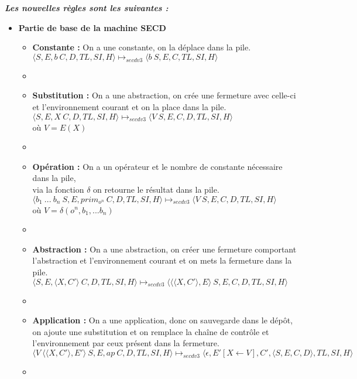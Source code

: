 \documentclass[10pt,a4paper]{article}
\begin{document}
				
				\textbf{\textit{Les nouvelles règles sont les suivantes :}}
				\smallbreak
				\begin{itemize}
					\item[] \textbf{Partie de base de la machine SECD}
					\begin{itemize}
						\item[] \textbf{Constante :} On a une constante, on la déplace dans la pile.
						\smallbreak
						$\langle S,E,b~C,D,TL,SI,H\rangle \longmapsto_{secdv3} \langle b~S,E,C,TL,SI,H\rangle$
						\item[]
						
						\item[] \textbf{Substitution :} On a une abstraction, on crée une fermeture avec celle-ci et l'environnement courant et on la place dans la pile.
						\smallbreak
						$\langle S,E,X~C,D,TL,SI,H\rangle \longmapsto_{secdv3} \langle V~S,E,C,D,TL,SI,H\rangle$
						\\où $V = E(X)$
						\item[]
						
						\item[] \textbf{Opération :} On a un opérateur et le nombre de constante nécessaire dans la pile, \\via la fonction $\delta$ on retourne le résultat dans la pile.
						\smallbreak
						$\langle b_{1}~...~b_{n}~S,E,prim_{o^{n}}~C,D,TL,SI,H\rangle \longmapsto_{secdv3} \langle V~S,E,C,D,TL,SI,H\rangle$ 
						\\où $V = \delta(o^{n},b_1,...b_{n})$
						\item[]
						
						\item[]  \textbf{Abstraction :} On a une abstraction, on créer une fermeture comportant l'abstraction et l'environnement courant et on mets la fermeture dans la pile.
						\smallbreak 
						$\langle S,E,\langle X,C'\rangle~C,D,TL,SI,H\rangle \longmapsto_{secdv3} \langle\langle\langle X,C'\rangle,E\rangle~S,E,C,D,TL,SI,H\rangle$
						\item[]
						
						\item[]  \textbf{Application :} On a une application, donc on sauvegarde dans le dépôt, on ajoute une substitution et on remplace la chaîne de contrôle et l'environnement par ceux présent dans la fermeture.
						\smallbreak
						$\langle V~\langle\langle X,C'\rangle,E'\rangle~S,E,ap~C,D,TL,SI,H\rangle \longmapsto_{secdv3} \langle\epsilon,E'[X \leftarrow V],C',\langle S,E,C,D\rangle,TL,SI,H\rangle$
						\item[]
						

\end{itemize}
\end{itemize}
\end{document}
